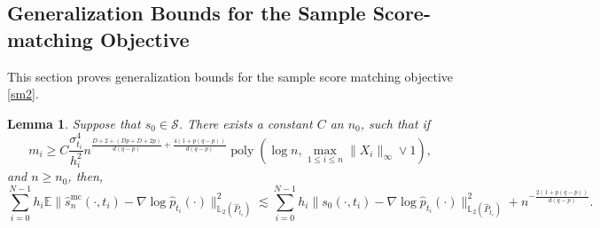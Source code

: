 \documentclass[12pts]{article}
\newtheorem{lemma}[defn]{Lemma}%
\newcommand{\sS}{ \mathscr{S}}
\newcommand{\hP}{ \hat{P}}
\newcommand{\E}{\mathbb{E}}
\newcommand{\fL}{\mathbb{L}}
\newcommand{\hp}{\hat{p}}
\begin{document}
\subsection{Generalization Bounds for the Sample Score-matching Objective}
This section proves generalization bounds for the sample score matching objective \eqref{sm2}.
\begin{lemma}\label{lem_21}
Suppose that $s_0 \in \sS$. There exists a constant $C$ an $n _0$, such that if  \[m_i \ge C \frac{\sigma_{t_i}^4}{h_i^2} n^{\frac{D+2 + (Dp + D + 2p)}{d(q-p)} + \frac{4(1+p(q-p))}{d(q-p)}} \operatorname{poly}(\log n , \max_{1 \le i \le n}\|X_i\|_\infty \vee 1),\] and $n \ge n_0$, then, 
    \[\sum_{i=0}^{N-1} h_i  \E \| \hat{s}^{\mathrm{mc}}_n(\cdot, t_i) - \nabla \log \hp_{t_i}(\cdot)\|^2_{\fL_2(\hP_{t_i})} \lesssim \sum_{i=0}^{N-1} h_i  \| s_0(\cdot, t_i) - \nabla \log \hp_{t_i}(\cdot)\|^2_{\fL_2(\hP_{t_i})} + n^{-\frac{2(1+p(q-p))}{d(q-p)}}.  \]
\end{lemma}
\end{document}
